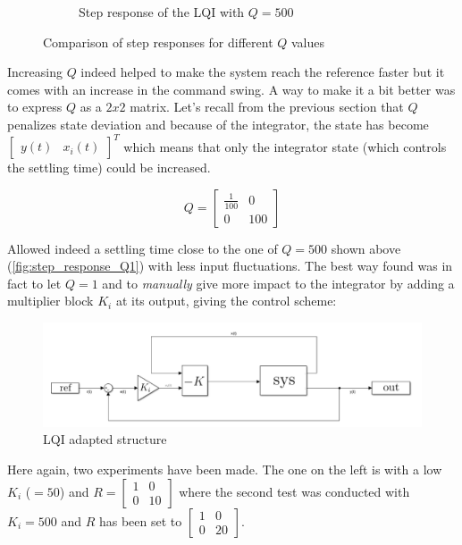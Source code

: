 \begin{figure}[H]
\begin{subfigure}[b]{0.5\textwidth}
        \caption{Step response of the LQI with $Q = 500$}
        \label{fig:step_response_Q500}
    \end{subfigure}
    \caption{Comparison of step responses for different $Q$ values}
    \label{fig:step_responses}
\end{figure}

Increasing $Q$ indeed helped to make the system reach the reference faster but it comes with an increase in the command
swing. A way to make it a bit better was to express $Q$ as a $2x2$ matrix. Let's recall from the previous section that $Q$ penalizes state deviation and because of the integrator, the state has become $\begin{bmatrix}y(t) & x_i(t)\end{bmatrix}^T$ which means that only the integrator state (which controls the settling time) could be increased.

\begin{equation*}
    Q = \begin{bmatrix}
        \frac{1}{100} & 0\\
        0 & 100
    \end{bmatrix}
\end{equation*}

Allowed indeed a settling time close to the one of $Q = 500$ shown above (\ref{fig:step_response_Q1}) with
less input fluctuations. The best way found was in fact to let $Q = 1$ and to \textit{manually} give more impact to the integrator by
adding a multiplier block $K_i$ at its output, giving the control scheme:

\begin{figure}[H]
    \centering
    \includegraphics[width = \textwidth]{Pictures/lqi_controller.png}
    \caption{LQI adapted structure}
    \label{fig:lqi modified}
\end{figure}

Here again, two experiments have been made. The one on the left is with a low $K_i$ ($= 50$) and $R = 
\begin{bmatrix}1&0\\0&10\end{bmatrix}$ where the second test was conducted with $K_i = 500$ and $R$ has been set to
$\begin{bmatrix}1&0\\0&20\end{bmatrix}$.

